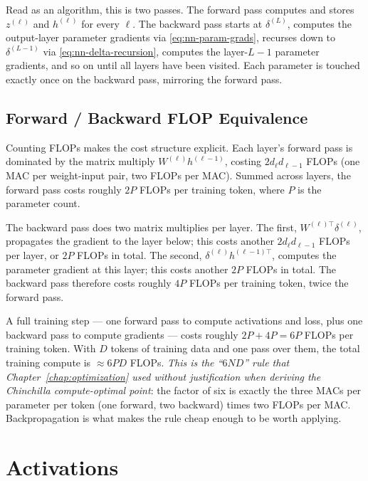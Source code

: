 Read as an algorithm, this is two passes. The forward pass
computes and stores $z^{(\ell)}$ and $h^{(\ell)}$ for every
$\ell$. The backward pass starts at $\delta^{(L)}$, computes the
output-layer parameter gradients via \eqref{eq:nn-param-grads},
recurses down to $\delta^{(L-1)}$ via \eqref{eq:nn-delta-recursion},
computes the layer-$L{-}1$ parameter gradients, and so on until
all layers have been visited. Each parameter is touched exactly
once on the backward pass, mirroring the forward pass.

\subsection{Forward / Backward FLOP Equivalence}

Counting FLOPs makes the cost structure explicit. Each layer's
forward pass is dominated by the matrix multiply $W^{(\ell)}
h^{(\ell-1)}$, costing $2 d_\ell d_{\ell-1}$ FLOPs (one MAC per
weight-input pair, two FLOPs per MAC). Summed across layers, the
forward pass costs roughly $2 P$ FLOPs per training token, where
$P$ is the parameter count.

The backward pass does two matrix multiplies per layer. The
first, $W^{(\ell)\top} \delta^{(\ell)}$, propagates the gradient
to the layer below; this costs another $2 d_\ell d_{\ell-1}$
FLOPs per layer, or $2 P$ FLOPs in total. The second,
$\delta^{(\ell)} h^{(\ell-1)\top}$, computes the parameter
gradient at this layer; this costs another $2 P$ FLOPs in total.
The backward pass therefore costs roughly $4 P$ FLOPs per
training token, twice the forward pass.

A full training step --- one forward pass to compute activations
and loss, plus one backward pass to compute gradients --- costs
roughly $2 P + 4 P = 6 P$ FLOPs per training token. With $D$
tokens of training data and one pass over them, the total
training compute is $\approx 6 P D$ FLOPs. \emph{This is the
``$6 N D$'' rule that Chapter~\ref{chap:optimization} used without justification when
deriving the Chinchilla compute-optimal point}: the factor of six
is exactly the three MACs per parameter per token (one forward,
two backward) times two FLOPs per MAC. Backpropagation is what
makes the rule cheap enough to be worth applying.


\section{Activations}
\label{sec:nn-activations}

